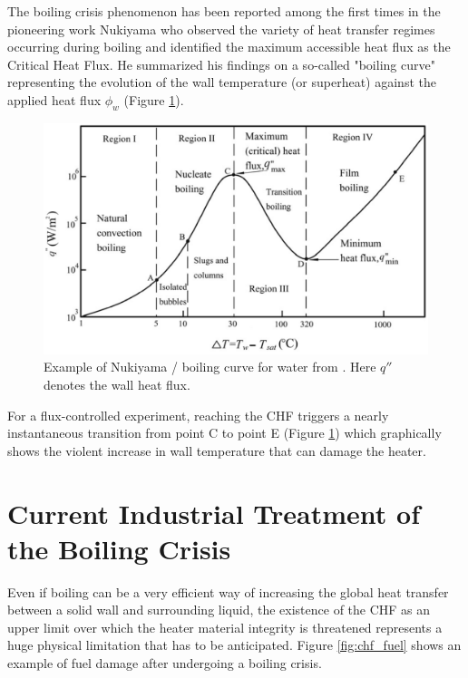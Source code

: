 The boiling crisis phenomenon has been reported among the first times in the pioneering work Nukiyama \cite{nukiyama_maximum_1966} who observed the variety of heat transfer regimes occurring during boiling and identified the maximum accessible heat flux as the Critical Heat Flux. He summarized his findings on a so-called "boiling curve" representing the evolution of the wall temperature (or superheat) against the applied heat flux $\phi_{w}$ (Figure \ref{fig:nukiyama_curve}).

\begin{figure}[!h]
\centering
\includegraphics[width=0.7\linewidth]{img/intro/nukiyama.png}
\caption{Example of Nukiyama / boiling curve for water from \cite{faghri_10_2006}. Here $q''$ denotes the wall heat flux.}
\label{fig:nukiyama_curve}
\end{figure}


\npar

For a flux-controlled experiment, reaching the CHF triggers a nearly instantaneous transition from point C to point E (Figure \ref{fig:nukiyama_curve}) which graphically shows the violent increase in wall temperature that can damage the heater.


\section{Current Industrial Treatment of the Boiling Crisis}
\label{sec:intro_chf_indus}

Even if boiling can be a very efficient way of increasing the global heat transfer between a solid wall and surrounding liquid, the existence of the CHF as an upper limit over which the heater material integrity is threatened represents a huge physical limitation that has to be anticipated. Figure \ref{fig:chf_fuel} shows an example of fuel damage after undergoing a boiling crisis.


